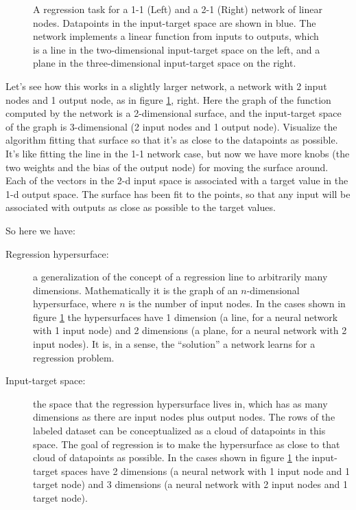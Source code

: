 \begin{figure}[h]
\centering
{}
\caption[Jeff Yoshimi.]{A regression task for a 1-1 (Left) and a 2-1 (Right) network of linear nodes. Datapoints in the input-target space are shown in  blue. The network implements a linear function from inputs to outputs, which is a line in the two-dimensional input-target space on the left, and a plane in the three-dimensional input-target space on the right. }
\label{visualize_regression}
\end{figure}

Let's see how this works in a slightly larger network, a network with 2 input nodes and 1 output node, as in figure \ref{visualize_regression}, right. Here the graph of the function computed by the network is a 2-dimensional surface, and the input-target space of the graph is 3-dimensional (2 input nodes and 1 output node). Visualize the algorithm fitting that surface so that it's as close to the datapoints as possible. It's like fitting the line in the 1-1 network case, but now we have more knobs (the two weights and the bias of the output node) for moving the surface around. Each of the vectors in the 2-d input space is associated with a target value in the 1-d output space. The surface has been fit to the points, so that any input will be associated with outputs as close as possible to the target values.

So here we have:
\begin{description}
\item[Regression hypersurface:] a generalization of the concept of a regression line to arbitrarily many dimensions. Mathematically it is the graph of an $n$-dimensional hypersurface, where $n$ is the number of input nodes. In the cases shown in figure \ref{visualize_regression} the hypersurfaces have 1 dimension (a line, for a neural network with 1 input node) and 2 dimensions (a plane, for a neural network with 2 input nodes). It is, in a sense, the ``solution'' a network learns for a regression problem.
\item[Input-target space:] the space that the regression hypersurface lives in, which has as many dimensions as there are input nodes plus output nodes. The rows of the labeled dataset can be conceptualized as a cloud of datapoints in this space. The goal of regression is to make the hypersurface as close to that cloud of datapoints as possible. In the cases shown in figure \ref{visualize_regression} the input-target spaces have 2 dimensions (a neural network with 1 input node and 1 target node) and 3 dimensions (a neural network with 2 input nodes and 1 target node).
\end{description}

